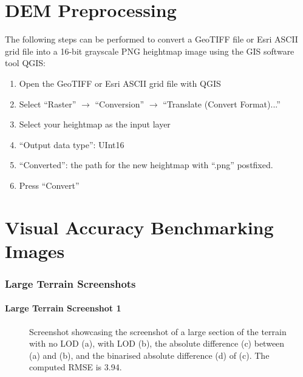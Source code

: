 \appendix
\chapter{DEM Preprocessing}
The following steps can be performed to convert 
a GeoTIFF file or Esri ASCII grid file 
into a 16-bit grayscale PNG heightmap image using 
the GIS software tool QGIS:
\begin{enumerate}
  \item Open the GeoTIFF or Esri ASCII grid file with QGIS
  \item Select ``Raster'' $\rightarrow$ ``Conversion''  $\rightarrow$ ``Translate (Convert Format)...''
  \item Select your heightmap as the input layer
  \item ``Output data type'': UInt16
  \item ``Converted'': the path for the new heightmap with ``.png'' postfixed.
  \item Press ``Convert''
\end{enumerate}

\chapter{Visual Accuracy Benchmarking Images}
\subsection{Large Terrain Screenshots}
\subsubsection{Large Terrain Screenshot 1}
\begin{figure}[H]
  \centering
  \qquad
  \qquad
  \qquad
  \caption{Screenshot showcasing the screenshot of a large section of the terrain with no LOD (a), with LOD (b),
   the absolute difference (c) between (a) and (b), and the binarised absolute difference (d) of (c). The computed RMSE is 3.94.}\label{fig:results-large-1}
\end{figure}
